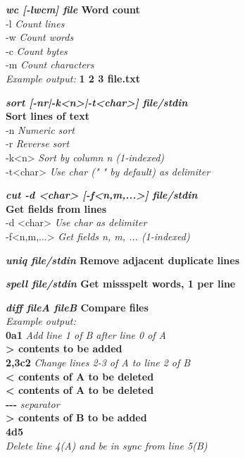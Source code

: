 \textbf{\emph{wc [-lwcm] file} \hfill Word count}\\
\quad -l \hfill \textit{Count lines}\\
\quad -w \hfill \textit{Count words}\\
\quad -c \hfill \textit{Count bytes}\\
\quad -m \hfill \textit{Count characters}\\
\textit{Example output:}
\quad \textbf{  1  2  3 file.txt}

\textbf{\emph{sort [-nr|-k<n>|-t<char>] file/stdin} \\\hfill Sort lines of text}\\
\quad -n \hfill \textit{Numeric sort}\\
\quad -r \hfill \textit{Reverse sort}\\
\quad -k<n> \hfill \textit{Sort by column n (1-indexed)}\\
\quad -t<char> \hfill \textit{Use char (" " by default) as delimiter}

\textbf{\emph{cut -d <char> [-f<n,m,...>] file/stdin} \\\hfill Get fields from lines}\\
\quad -d <char> \hfill \textit{Use char as delimiter}\\
\quad -f<n,m,...> \hfill \textit{Get fields n, m, ... (1-indexed)}

\textbf{\emph{uniq file/stdin} \hfill Remove adjacent duplicate lines}

\textbf{\emph{spell file/stdin} \hfill Get missspelt words, 1 per line}

\textbf{\emph{diff fileA fileB} \hfill Compare files}\\
\textit{Example output:}\\
\quad \textbf{0a1}
\hfill \textit{Add line 1 of B after line 0 of A}\\
\quad \textbf{> contents to be added}\\
\quad \textbf{2,3c2}
\hfill \textit{Change lines 2-3 of A to line 2 of B}\\
\quad \textbf{< contents of A to be deleted}\\
\quad \textbf{< contents of A to be deleted}\\
\quad \textbf{-{}-{}-} \hfill \textit{separator}\\
\quad \textbf{> contents of B to be added}\\
\quad \textbf{4d5}\\
\hfill \textit{Delete line 4(A) and be in sync from line 5(B)}

